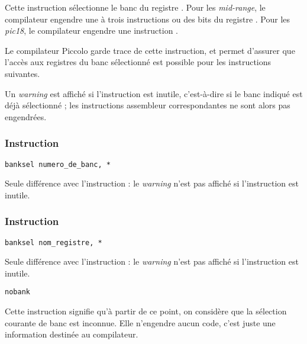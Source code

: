 Cette instruction sélectionne le banc du registre . Pour les \emph{mid-range}, le compilateur engendre une à trois instructions  ou  des bits  du registre . Pour les \emph{pic18}, le compilateur engendre une instruction .

Le compilateur Piccolo garde trace de cette instruction, et permet d'assurer que l'accès aux registres du banc sélectionné est possible pour les instructions suivantes.

Un \emph{warning} est affiché si l'instruction est inutile, c'est-à-dire si le banc indiqué est déjà sélectionné ; les instructions assembleur correspondantes ne sont alors pas engendrées.




\subsubsection{Instruction }
\begin{lstlisting}[language=piccolo]
banksel numero_de_banc, *
\end{lstlisting}

Seule différence avec l'instruction  : le \emph{warning} n'est pas affiché si l'instruction est inutile.






\subsubsection{Instruction }
\begin{lstlisting}[language=piccolo]
banksel nom_registre, *
\end{lstlisting}

Seule différence avec l'instruction  : le \emph{warning} n'est pas affiché si l'instruction est inutile.







\begin{lstlisting}[language=piccolo]
nobank
\end{lstlisting}

Cette instruction signifie qu'à partir de ce point, on considère que la sélection courante de banc est inconnue. Elle n'engendre aucun code, c'est juste une information destinée au compilateur.

